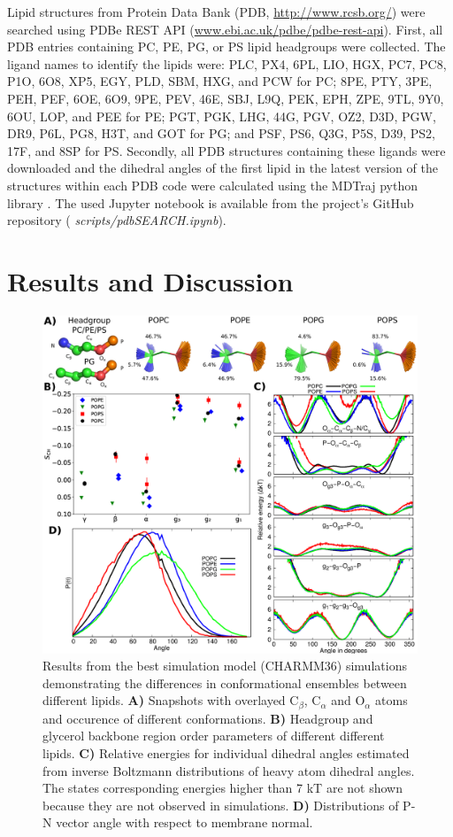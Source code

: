 \documentclass[aps,prl,superscriptaddress,twocolumn]{revtex4}
\begin{document}
Lipid structures from Protein Data Bank (PDB, \url{http://www.rcsb.org/})
were searched using PDBe REST API (\url{www.ebi.ac.uk/pdbe/pdbe-rest-api}).
First, all PDB entries containing PC, PE, PG, or PS lipid headgroups were collected.
The ligand names to identify the lipids were:
PLC, PX4, 6PL, LIO, HGX, PC7, PC8, P1O, 6O8, XP5, EGY, PLD, SBM, HXG, and PCW for PC;
8PE, PTY, 3PE, PEH, PEF, 6OE, 6O9, 9PE, PEV, 46E, SBJ, L9Q, PEK, EPH, ZPE, 9TL, 9Y0, 6OU, LOP, and PEE for PE;
PGT, PGK, LHG, 44G, PGV, OZ2, D3D, PGW, DR9, P6L, PG8, H3T, and GOT for PG; and
PSF, PS6, Q3G, P5S, D39, PS2, 17F, and 8SP for PS.
Secondly, all PDB structures containing these ligands were downloaded and the dihedral angles of the first lipid in the latest version of the structures within each PDB code were calculated using the MDTraj python library \cite{mcgibbon15}.
The used Jupyter notebook is available from the project's GitHub repository (\textit{ scripts/pdbSEARCH.ipynb}).



\section{Results and Discussion}

\begin{figure}[bt]
  \centering
   \includegraphics[width=18.0cm]{./Figs/figure2.eps}
   \caption{\label{structures}
     Results from the best simulation model (CHARMM36) simulations demonstrating the differences in conformational ensembles between different lipids. 
     \textbf{A)} Snapshots with overlayed C$_\beta$, C$_\alpha$ and O$_\alpha$ atoms and occurence of different conformations.
     \textbf{B)} Headgroup and glycerol backbone region order parameters of different different lipids.
     \textbf{C)} Relative energies for individual dihedral angles estimated from inverse Boltzmann distributions of heavy atom dihedral angles.
     The states corresponding energies higher than 7 kT are not shown because they are not observed in simulations.
     \textbf{D)} Distributions of P-N vector angle with respect to membrane normal.
  }
\end{figure}
\end{document}

